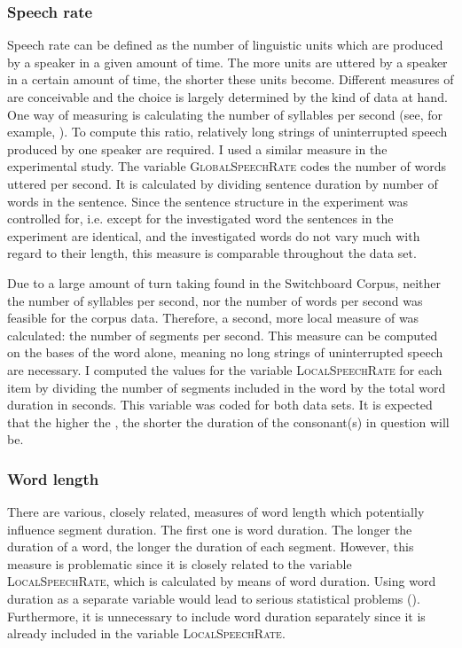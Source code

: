 \subsubsection{Speech rate} Speech rate can be defined as the number of linguistic units which are produced by a speaker in a given amount of time. The more units are uttered by a speaker in a certain amount of time, the shorter these units become. Different measures of  are conceivable and the choice is largely determined by the kind of data at hand. One way of measuring  is calculating the number of syllables per second (see, for example, \citealt{Pluymaekers.2005, Plag.2017}). To compute this ratio, relatively long strings of uninterrupted speech produced by one speaker are required.  I used a similar measure in the experimental study. The variable \textsc{GlobalSpeechRate} codes the number of words uttered per second. It is calculated by dividing sentence duration by number of words in the sentence. Since the sentence structure in the experiment was controlled for, i.e. except for the investigated word the sentences in the experiment are identical, and the investigated words do not vary much with regard to their length, this measure is comparable throughout the data set. 

Due to a large amount of turn taking found in the Switchboard Corpus, neither the number of syllables per second, nor the number of words per second was feasible for the corpus data. Therefore, a second, more local measure of  was calculated: the number of segments per second. This measure can be computed on the bases of the word alone, meaning no long strings of uninterrupted speech are necessary.
I computed the values for the variable \textsc{LocalSpeechRate} for each item by dividing the number of segments included in the word by the total word duration in seconds.  This variable was coded for both data sets.
 It is expected that the higher the , the shorter the duration of the consonant(s) in question will be.

\subsubsection{Word length} There are various, closely related, measures of word length which potentially influence segment duration. The first one is word duration. The longer the duration of a word, the longer the duration of each segment. However, this measure is problematic since it is closely related to the variable \textsc{LocalSpeechRate}, which is calculated by means of word duration. Using word duration as a separate variable would lead to serious statistical problems (). Furthermore, it is unnecessary to include word duration separately since it is already included in the variable \textsc{LocalSpeechRate}.


